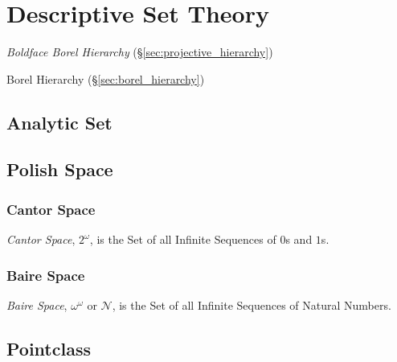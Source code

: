 \section{Descriptive Set Theory}\label{sec:descriptive_set_theory}

\emph{Boldface Borel Hierarchy} (\S\ref{sec:projective_hierarchy})

Borel Hierarchy (\S\ref{sec:borel_hierarchy})



\subsection{Analytic Set}\label{sec:analytic_set}

\subsection{Polish Space}\label{sec:polish_space}

\subsubsection{Cantor Space}\label{sec:cantor_space}

\emph{Cantor Space}, $2^{\omega}$, is the Set of all Infinite
Sequences of $0$s and $1$s.



\subsubsection{Baire Space}\label{sec:baire_space}

\emph{Baire Space}, $\omega^{\omega}$ or $\mathcal{N}$, is the Set of
all Infinite Sequences of Natural Numbers.



\subsection{Pointclass}\label{sec:pointclass}

